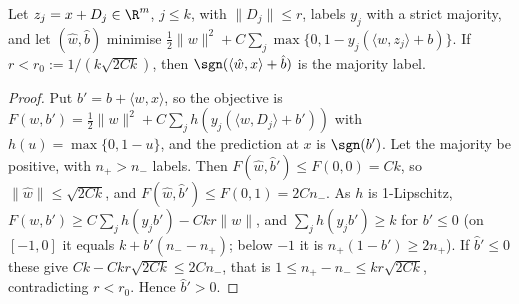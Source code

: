 \begin{lemma}\label{lem:majority}
Let $z_j=x+D_j\in\R^m$, $j\le k$, with $\|D_j\|\le r$, labels $y_j$ with a strict majority, and let $(\hat w,\hat b)$ minimise $\tfrac12\|w\|^2+C\sum_j\max\{0,1-y_j(\langle w,z_j\rangle+b)\}$. If $r<r_0:=1/(k\sqrt{2Ck})$, then $\sgn(\langle\hat w,x\rangle+\hat b)$ is the majority label.
\end{lemma}
\begin{proof}
Put $b'=b+\langle w,x\rangle$, so the objective is $F(w,b')=\tfrac12\|w\|^2+C\sum_j h(y_j(\langle w,D_j\rangle+b'))$ with $h(u)=\max\{0,1-u\}$, and the prediction at $x$ is $\sgn(b')$. Let the majority be positive, with $n_+>n_-$ labels. Then $F(\hat w,\hat b')\le F(0,0)=Ck$, so $\|\hat w\|\le\sqrt{2Ck}$, and $F(\hat w,\hat b')\le F(0,1)=2Cn_-$. As $h$ is 1-Lipschitz, $F(w,b')\ge C\sum_jh(y_jb')-Ckr\|w\|$, and $\sum_jh(y_jb')\ge k$ for $b'\le0$ (on $[-1,0]$ it equals $k+b'(n_--n_+)$; below $-1$ it is $n_+(1-b')\ge2n_+$). If $\hat b'\le0$ these give $Ck-Ckr\sqrt{2Ck}\le2Cn_-$, that is $1\le n_+-n_-\le kr\sqrt{2Ck}$, contradicting $r<r_0$. Hence $\hat b'>0$.
\end{proof}

